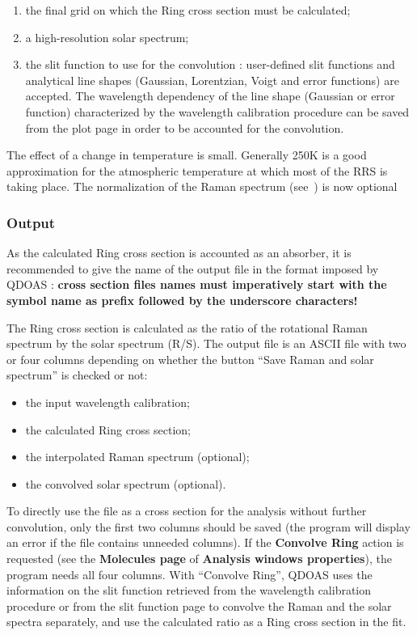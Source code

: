 \begin{minipage}[t]{\textwidth}
\vspace{-1\baselineskip}
\begin{enumerate} \itemsep -6pt
\item the final grid on which the Ring cross section must be calculated;
\item a high-resolution solar spectrum;
\item the slit function to use for the convolution : user-defined slit functions and analytical line shapes (Gaussian, Lorentzian, Voigt and error functions) are accepted. The wavelength dependency of the line shape (Gaussian or error function) characterized by the wavelength calibration procedure can be saved from the plot page in order to be accounted for the convolution.
\end{enumerate}
\end{minipage}
\vskip 6pt
The effect of a change in temperature is small. Generally 250K is a good approximation for the atmospheric temperature at which most of the RRS is taking place.  The normalization of the Raman spectrum (see~\citep{Wagner2009}) is now optional

\subsubsection{Output}

As the calculated Ring cross section is accounted as an absorber, it is recommended to give the name of the output file in the format imposed by QDOAS : \textbf{cross section files names must imperatively start with the symbol name as prefix followed by the underscore characters!}

The Ring cross section is calculated as the ratio of the rotational
Raman spectrum by the solar spectrum (R/S).  The output file is an
ASCII file with two or four columns depending on whether the button ``Save
Raman and solar spectrum'' is checked or not: \vskip 3pt
\begin{minipage}[t]{\textwidth}
\vspace{-1\baselineskip}
\begin{itemize} \itemsep -6pt
\item the input wavelength calibration;
\item the calculated Ring cross section;
\item the interpolated Raman spectrum (optional);
\item the convolved solar spectrum (optional).
\end{itemize}
\end{minipage}
\vskip 6pt
To directly use the file as a cross section for the analysis without further convolution, only the first two columns should be saved (the program will display an error if the file contains unneeded columns).  If the \textbf{Convolve Ring} action is requested (see the \textbf{Molecules page} of \textbf{Analysis windows properties}), the program needs all four columns.  With ``Convolve Ring'', QDOAS uses the information on the slit function retrieved from the wavelength calibration procedure or from the slit function page to convolve the Raman and the solar spectra separately, and use the calculated ratio as a Ring cross section in the fit.

